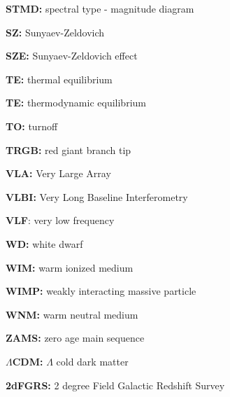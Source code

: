 \documentclass[a4paper,10pt]{article}
\begin{document}
{\noindent}\textbf{STMD:} spectral type - magnitude diagram

{\noindent}\textbf{SZ:} Sunyaev-Zeldovich

{\noindent}\textbf{SZE:} Sunyaev-Zeldovich effect

{\noindent}\textbf{TE:} thermal equilibrium

{\noindent}\textbf{TE:} thermodynamic equilibrium

{\noindent}\textbf{TO:} turnoff

{\noindent}\textbf{TRGB:} red giant branch tip

{\noindent}\textbf{VLA:} Very Large Array

{\noindent}\textbf{VLBI:} Very Long Baseline Interferometry

{\noindent}\textbf{VLF}: very low frequency

{\noindent}\textbf{WD:} white dwarf

{\noindent}\textbf{WIM:} warm ionized medium

{\noindent}\textbf{WIMP:} weakly interacting massive particle

{\noindent}\textbf{WNM:} warm neutral medium

{\noindent}\textbf{ZAMS:} zero age main sequence

{\noindent}\textbf{$\Lambda$CDM:} $\Lambda$ cold dark matter

{\noindent}\textbf{2dFGRS:} 2 degree Field Galactic Redshift Survey







































\end{document}
